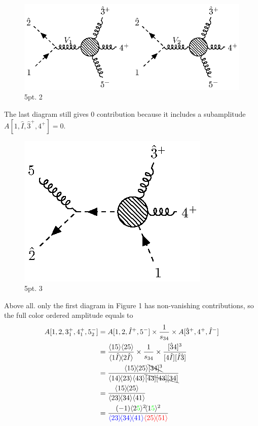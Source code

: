 \documentclass[12pt]{article}
\newcommand{\mdavg}[2]{\langle #1 \rangle\!\langle #2 \rangle}
\newcommand{\avg}[1]{\langle #1 \rangle}
\newcommand{\doubleavg}[2]{\left\langle #1 \right\rangle\!\left\langle #2 \right\rangle}
\begin{document}
\begin{figure}
    \centering
    \includegraphics{5pt2.eps}
    \caption{5pt. 2}
    \label{3}
\end{figure}
\par
The last diagram still gives 0 contribution because it includes a subamplitude $A[1,\hat{I},\hat{3}^+,4^+]=0$.
\par
\begin{figure}[H]
    \centering
    \includegraphics{5pt3.eps}
    \caption{5pt. 3}
    \label{4}
\end{figure}
Above all. only the first diagram in Figure 1 has non-vanishing contributions, so the full color ordered amplitude equals to
\begin{align*}
    A[1,2,3_1^+,4_1^+,5_2^-]&=A[1,2,\hat{I}^+,5^-]\times\frac{1}{s_{34}}\times A[\hat{3}^+,4^+,\hat{I}^-]\\
    &=\frac{\doubleavg{15}{25}}{\mdavg{1\hat{I}}{2\hat{I}}}\times\frac{1}{s_{34}}\times\frac{[\hat{3}4]^3}{[4\hat{I}][\hat{I}\hat{3}]}\\
    &=\frac{\mdavg{15}{25}\bcancel{[34]^3}}{\mdavg{14}{23}\avg{43}\bcancel{[43][43][34]}}\\
    &=\frac{\mdavg{15}{25}}{\mdavg{23}{34}\avg{41}}\\
    &=\frac{(-1)\avg{2\textcolor{green}{5}}^2\!\avg{1\textcolor{green}{5}}^2}{\textcolor{blue}{\mdavg{23}{34}\!\avg{41}}\textcolor{red}{\mdavg{25}{51}}}
\end{align*}
\end{document}
